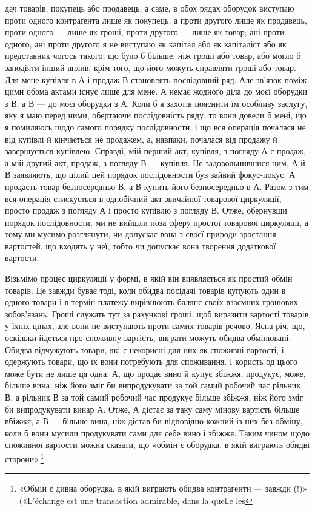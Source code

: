 дач товарів, покупець або продавець, а саме, в обох рядах оборудок
виступаю проти одного контраґента лише як покупець, а
проти другого лише як продавець, проти одного — лише як
гроші, проти другого — лише як товар; ані проти одного, ані
проти другого я не виступаю як капітал або як капіталіст або
як представник чогось такого, що було б більше, ніж гроші або
товар, або могло б заподіяти інший вплив, крім того, що його
можуть справляти гроші або товар. Для мене купівля в А і продаж
В становлять послідовний ряд. Але зв’язок поміж цими
обома актами існує лише для мене. А немає жодного діла до моєї
оборудки з В, а В — до моєї оборудки з А. Коли б я захотів пояснити
їм особливу заслугу, яку я маю перед ними, обертаючи
послідовність ряду, то вони довели б мені, що я помиляюсь щодо
самого порядку послідовности, і що вся операція почалася не
від купівлі й кінчається не продажем, а, навпаки, почалася від
продажу й завершується купівлею. Справді, мій перший акт,
купівля, з погляду А є продаж, а мій другий акт, продаж, з
погляду В — купівля. Не задовольнившися цим, А й В заявляють,
що цілий цей порядок послідовности був зайвий фокус-покус.
А продасть товар безпосередньо В, а В купить його безпосередньо
в А. Разом з тим вся операція стискується в однобічний
акт звичайної товарової циркуляції, — просто продаж з погляду
А і просто купівлю з погляду В. Отже, обернувши порядок послідовности,
ми не вийшли поза сферу простої товарової циркуляції,
а тому ми мусимо розглянути, чи допускає вона з своєї природи
зростання вартостей, що входять у неї, тобто чи допускає вона
творення додаткової вартости.

Візьмімо процес циркуляції у формі, в якій він виявляється
як простий обмін товарів. Це завжди буває тоді, коли обидва
посідачі товарів купують один в одного товари і в термін платежу
вирівнюють балянс своїх взаємних грошових зобов’язань. Гроші
служать тут за рахункові гроші, щоб виразити вартості товарів
у їхніх цінах, але вони не виступають проти самих товарів речово.
Ясна річ, що, оскільки йдеться про споживну вартість,
виграти можуть обидва обмінювані. Обидва відчужують товари,
які є некорисні для них як споживні вартості, і одержують товари,
що їх вони потребують для споживання. І користь од цього може
бути не лише ця одна. А, що продає вино й купує збіжжя, продукує,
може, більше вина, ніж його зміг би випродукувати за той
самий робочий час рільник В, а рільник В за той самий робочий
час продукує більше збіжжя, ніж його зміг би випродукувати
винар А. Отже, А дістає за таку саму мінову вартість більше
вбіжжя, а В — більше вина, ніж дістав би відповідно кожний
із них без обміну, коли б вони мусили продукувати сами для себе
вино і збіжжя. Таким чином щодо споживної вартости можна
сказати, що «обмін є оборудка, в якій виграють обидві сторони».\footnote{
«Обмін є дивна оборудка, в якій виграють обидва контрагенти —
завжди (!)» («L’échange est une transaction admirable, dans la quelle les
}